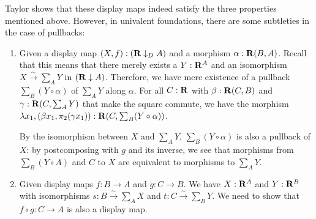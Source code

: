 Taylor shows that these display maps indeed satisfy the three properties mentioned above. However, in univalent foundations, there are some subtleties in the case of pullbacks:
\begin{enumerate}
  \item Given a display map $ (X, f): (\mathbf{R} \downarrow_D A) $ and a morphism $ \alpha: \mathbf{R}(B, A) $. Recall that this means that there merely exists a $ Y: \mathbf{R}^A $ and an isomorphism $ X \xrightarrow \sim \sum_A Y $ in $ (\mathbf{R} \downarrow A) $. Therefore, we have mere existence of a pullback $ \sum_B (Y \circ \alpha) $ of $ \sum_A Y $ along $ \alpha $. For all $ C: \mathbf{R} $ with $ \beta: \mathbf{R}(C, B) $ and $ \gamma: \mathbf{R}(C, \sum_A Y) $ that make the square commute, we have the morphism $ \lambda x_1, (\beta x_1, \pi_2 (\gamma x_1)): \mathbf{R}(C, \sum_B (Y \circ \alpha)) $.
    \begin{center}
    \end{center}
    By the isomorphism between $ X $ and $ \sum_A Y $, $ \sum_B (Y \circ \alpha) $ is also a pullback of $ X $: by postcomposing with $ g $ and its inverse, we see that morphisms from $ \sum_B (Y \circ A) $ and $ C $ to $ X $ are equivalent to morphisms to $ \sum_A Y $.
  \item Given display maps $ f: B \to A $ and $ g: C \to B $. We have $ X : \mathbf{R}^A $ and $ Y: \mathbf{R}^B $ with isomorphisms $ s: B \xrightarrow \sim \sum_A X $ and $ t: C \xrightarrow \sim \sum_B Y $. We need to show that $ f \circ g: C \to A $ is also a display map.
    \begin{center}

\end{center}
\end{enumerate}
